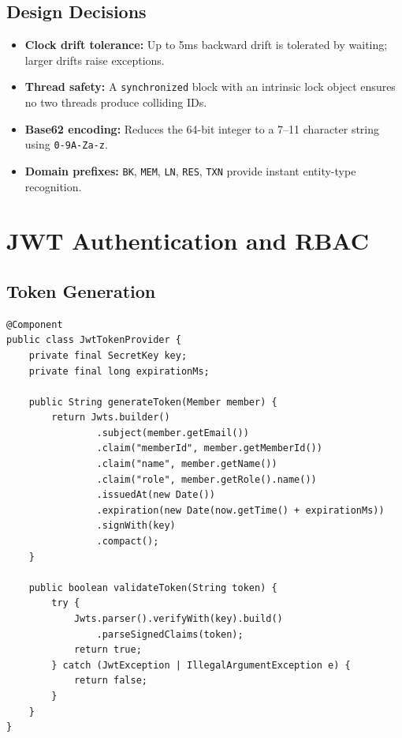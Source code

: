 \documentclass[12pt,a4paper]{report}
\begin{document}
\subsection{Design Decisions}
\begin{itemize}
    \item \textbf{Clock drift tolerance:} Up to 5ms backward drift is tolerated by waiting; larger drifts raise exceptions.
    \item \textbf{Thread safety:} A \texttt{synchronized} block with an intrinsic lock object ensures no two threads produce colliding IDs.
    \item \textbf{Base62 encoding:} Reduces the 64-bit integer to a 7--11 character string using \texttt{0-9A-Za-z}.
    \item \textbf{Domain prefixes:} \texttt{BK}, \texttt{MEM}, \texttt{LN}, \texttt{RES}, \texttt{TXN} provide instant entity-type recognition.
\end{itemize}

\section{JWT Authentication and RBAC}

\subsection{Token Generation}
\begin{lstlisting}[style=JavaStyle, caption={JwtTokenProvider.java -- JWT Creation and Validation}]
@Component
public class JwtTokenProvider {
    private final SecretKey key;
    private final long expirationMs;

    public String generateToken(Member member) {
        return Jwts.builder()
                .subject(member.getEmail())
                .claim("memberId", member.getMemberId())
                .claim("name", member.getName())
                .claim("role", member.getRole().name())
                .issuedAt(new Date())
                .expiration(new Date(now.getTime() + expirationMs))
                .signWith(key)
                .compact();
    }

    public boolean validateToken(String token) {
        try {
            Jwts.parser().verifyWith(key).build()
                .parseSignedClaims(token);
            return true;
        } catch (JwtException | IllegalArgumentException e) {
            return false;
        }
    }
}
\end{lstlisting}
\end{document}
